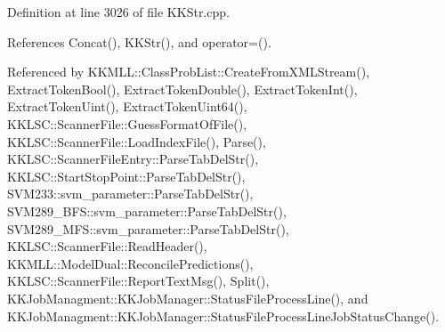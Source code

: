 Definition at line 3026 of file K\+K\+Str.\+cpp.



References Concat(), K\+K\+Str(), and operator=().



Referenced by K\+K\+M\+L\+L\+::\+Class\+Prob\+List\+::\+Create\+From\+X\+M\+L\+Stream(), Extract\+Token\+Bool(), Extract\+Token\+Double(), Extract\+Token\+Int(), Extract\+Token\+Uint(), Extract\+Token\+Uint64(), K\+K\+L\+S\+C\+::\+Scanner\+File\+::\+Guess\+Format\+Of\+File(), K\+K\+L\+S\+C\+::\+Scanner\+File\+::\+Load\+Index\+File(), Parse(), K\+K\+L\+S\+C\+::\+Scanner\+File\+Entry\+::\+Parse\+Tab\+Del\+Str(), K\+K\+L\+S\+C\+::\+Start\+Stop\+Point\+::\+Parse\+Tab\+Del\+Str(), S\+V\+M233\+::svm\+\_\+parameter\+::\+Parse\+Tab\+Del\+Str(), S\+V\+M289\+\_\+\+B\+F\+S\+::svm\+\_\+parameter\+::\+Parse\+Tab\+Del\+Str(), S\+V\+M289\+\_\+\+M\+F\+S\+::svm\+\_\+parameter\+::\+Parse\+Tab\+Del\+Str(), K\+K\+L\+S\+C\+::\+Scanner\+File\+::\+Read\+Header(), K\+K\+M\+L\+L\+::\+Model\+Dual\+::\+Reconcile\+Predictions(), K\+K\+L\+S\+C\+::\+Scanner\+File\+::\+Report\+Text\+Msg(), Split(), K\+K\+Job\+Managment\+::\+K\+K\+Job\+Manager\+::\+Status\+File\+Process\+Line(), and K\+K\+Job\+Managment\+::\+K\+K\+Job\+Manager\+::\+Status\+File\+Process\+Line\+Job\+Status\+Change().


